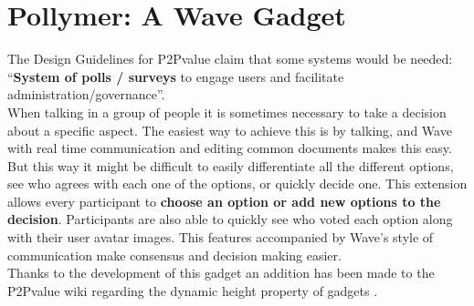 \thispagestyle{sectioned}
\chapter{Pollymer: A Wave Gadget}
\label{subsec:decision_intro}
The Design Guidelines for P2Pvalue \cite{ref:p2pvalue} claim that some systems would be needed: ``\textbf{System of polls / surveys} to engage users and facilitate administration/governance''.\\[.2cm]
When talking in a group of people it is sometimes necessary to take a decision about a specific aspect. The easiest way to achieve this is by talking, and Wave with real time communication and editing common documents makes this easy. But this way it might be difficult to easily differentiate all the different options, see who agrees with each one of the options, or quickly decide one. This extension allows every participant to \textbf{choose an option or add new options to the decision}. Participants are also able to quickly see who voted each option along with their user avatar images. This features accompanied by Wave's style of communication make consensus and decision making easier.\\[.2cm]
Thanks to the development of this gadget an addition has been made to the P2Pvalue wiki regarding the dynamic height property of gadgets \cite{ref:gadget_development}.

